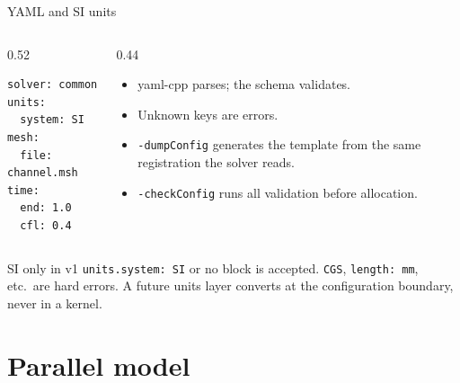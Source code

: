 \documentclass[aspectratio=169,10pt]{beamer}
\begin{document}
\begin{frame}[fragile]{YAML and SI units}
  \begin{columns}[T]
    \begin{column}{0.52\textwidth}
\begin{lstlisting}
solver: common
units:
  system: SI
mesh:
  file: channel.msh
time:
  end: 1.0
  cfl: 0.4
\end{lstlisting}
    \end{column}
    \begin{column}{0.44\textwidth}
      \begin{itemize}
        \item yaml-cpp parses; the schema validates.
        \item Unknown keys are errors.
        \item \texttt{-dumpConfig} generates the template from the same
              registration the solver reads.
        \item \texttt{-checkConfig} runs all validation before allocation.
      \end{itemize}
    \end{column}
  \end{columns}

  \vspace{0.5em}
  \begin{block}{SI only in v1}
    \texttt{units.system: SI} or no block is accepted. \texttt{CGS},
    \texttt{length: mm}, etc.\ are hard errors. A future units layer converts at
    the configuration boundary, never in a kernel.
  \end{block}
\end{frame}

\section{Parallel model}
\end{document}
